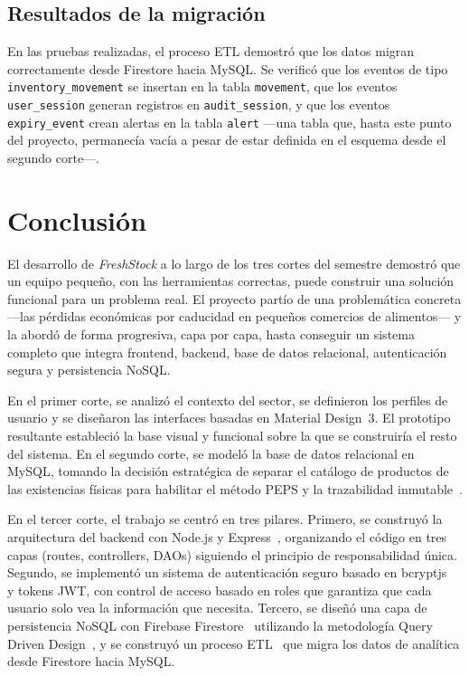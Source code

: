 \documentclass[journal]{IEEEtran}
\newcommand{\app}{\textit{FreshStock}}
\begin{document}
	\subsection{Resultados de la migraci\'{o}n}
	\label{subsec:resultados-etl}
	
	En las pruebas realizadas, el proceso ETL demostr\'{o} que
	los datos migran correctamente desde Firestore hacia MySQL.
	Se verific\'{o} que los eventos de tipo
	\texttt{inventory\_movement} se insertan en la tabla
	\texttt{movement}, que los eventos \texttt{user\_session}
	generan registros en \texttt{audit\_session}, y que los
	eventos \texttt{expiry\_event} crean alertas en la tabla
	\texttt{alert} ---una tabla que, hasta este punto del
	proyecto, permanec\'{i}a vac\'{i}a a pesar de estar definida
	en el esquema desde el segundo corte---.
	


	\section{Conclusi\'{o}n}
	\label{sec:conclusion}
	
	\balance
	
	El desarrollo de \app{} a lo largo de los tres cortes del
	semestre demostr\'{o} que un equipo peque\~{n}o, con las
	herramientas correctas, puede construir una soluci\'{o}n
	funcional para un problema real. El proyecto part\'{i}o de
	una problem\'{a}tica concreta ---las p\'{e}rdidas econ\'{o}micas
	por caducidad en peque\~{n}os comercios de alimentos--- y la
	abord\'{o} de forma progresiva, capa por capa, hasta
	conseguir un sistema completo que integra frontend, backend,
	base de datos relacional, autenticaci\'{o}n segura y
	persistencia NoSQL.
	
	En el primer corte, se analiz\'{o} el contexto del sector, se
	definieron los perfiles de usuario y se dise\~{n}aron las
	interfaces basadas en Material Design~3. El prototipo
	resultante estableci\'{o} la base visual y funcional sobre la
	que se construir\'{i}a el resto del sistema. En el segundo
	corte, se model\'{o} la base de datos relacional en MySQL,
	tomando la decisi\'{o}n estrat\'{e}gica de separar el
	cat\'{a}logo de productos de las existencias f\'{i}sicas
	para habilitar el m\'{e}todo PEPS y la trazabilidad
	inmutable~\cite{Silver:2016}.
	
	En el tercer corte, el trabajo se centr\'{o} en tres pilares.
	Primero, se construy\'{o} la arquitectura del backend con
	Node.js y Express~\cite{ExpressJS:2025}, organizando el
	c\'{o}digo en tres capas (routes, controllers, DAOs) siguiendo
	el principio de responsabilidad \'{u}nica. Segundo, se
	implement\'{o} un sistema de autenticaci\'{o}n seguro basado en
	bcryptjs~\cite{bcryptjs:2023} y tokens JWT, con control de
	acceso basado en roles que garantiza que cada usuario solo
	vea la informaci\'{o}n que necesita. Tercero, se
	dise\~{n}\'{o} una capa de persistencia NoSQL con Firebase
	Firestore~\cite{GoogleFirebase:2025} utilizando la
	metodolog\'{i}a Query Driven Design~\cite{Cattell:2011}, y
	se construy\'{o} un proceso ETL~\cite{Kimball:2013} que
	migra los datos de anal\'{i}tica desde Firestore hacia MySQL.
	
\end{document}
